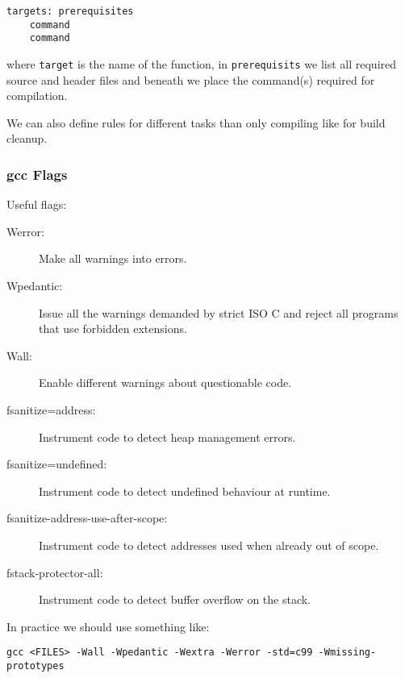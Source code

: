 \begin{verbatim}
targets: prerequisites
    command
    command
\end{verbatim}

where \verb+target+ is the name of the function, in \verb+prerequisits+ we list all required source and header files and beneath we place the command(s) required for compilation.

We can also define rules for different tasks than only compiling like for build cleanup.

\subsubsection{gcc Flags}
Useful flags:

\begin{description}
    \item[Werror:] Make all warnings into errors.
    \item[Wpedantic:] Issue all the warnings demanded by strict ISO C and reject all programs that use forbidden extensions.
    \item[Wall:] Enable different warnings about questionable code.
    \item[fsanitize=address:] Instrument code to detect heap management errors.
    \item[fsanitize=undefined:] Instrument code to detect undefined behaviour at runtime.
    \item[fsanitize-address-use-after-scope:] Instrument code to detect addresses used when already out of scope.
    \item[fstack-protector-all:] Instrument code to detect buffer overflow on the stack.
\end{description}

In practice we should use something like:

\verb+gcc <FILES> -Wall -Wpedantic -Wextra -Werror -std=c99 -Wmissing-prototypes+
